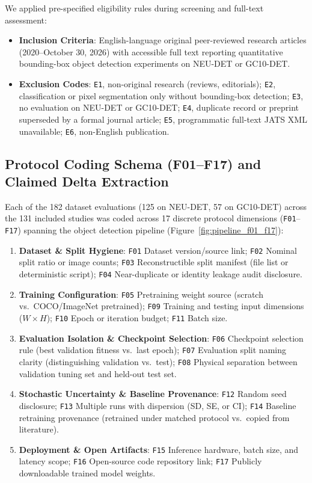 \documentclass[pdflatex,sn-apa]{sn-jnl}
\begin{document}
We applied pre-specified eligibility rules during screening and full-text assessment:
\begin{itemize}[leftmargin=2em, itemsep=0.1em]
    \item \textbf{Inclusion Criteria}: English-language original peer-reviewed research articles (2020--October 30, 2026) with accessible full text reporting quantitative bounding-box object detection experiments on NEU-DET or GC10-DET.
    \item \textbf{Exclusion Codes}: \texttt{E1}, non-original research (reviews, editorials); \texttt{E2}, classification or pixel segmentation only without bounding-box detection; \texttt{E3}, no evaluation on NEU-DET or GC10-DET; \texttt{E4}, duplicate record or preprint superseded by a formal journal article; \texttt{E5}, programmatic full-text JATS XML unavailable; \texttt{E6}, non-English publication.
\end{itemize}

\subsection{Protocol Coding Schema (F01--F17) and Claimed Delta Extraction}
Each of the 182 dataset evaluations (125 on NEU-DET, 57 on GC10-DET) across the 131 included studies was coded across 17 discrete protocol dimensions (\texttt{F01}--\texttt{F17}) spanning the object detection pipeline (Figure~\ref{fig:pipeline_f01_f17}):
\begin{enumerate}[leftmargin=2em, itemsep=0.05em]
    \item \textbf{Dataset \& Split Hygiene}: \texttt{F01} Dataset version/source link; \texttt{F02} Nominal split ratio or image counts; \texttt{F03} Reconstructible split manifest (file list or deterministic script); \texttt{F04} Near-duplicate or identity leakage audit disclosure.
    \item \textbf{Training Configuration}: \texttt{F05} Pretraining weight source (scratch vs.\ COCO/ImageNet pretrained); \texttt{F09} Training and testing input dimensions ($W \times H$); \texttt{F10} Epoch or iteration budget; \texttt{F11} Batch size.
    \item \textbf{Evaluation Isolation \& Checkpoint Selection}: \texttt{F06} Checkpoint selection rule (best validation fitness vs.\ last epoch); \texttt{F07} Evaluation split naming clarity (distinguishing validation vs.\ test); \texttt{F08} Physical separation between validation tuning set and held-out test set.
    \item \textbf{Stochastic Uncertainty \& Baseline Provenance}: \texttt{F12} Random seed disclosure; \texttt{F13} Multiple runs with dispersion (SD, SE, or CI); \texttt{F14} Baseline retraining provenance (retrained under matched protocol vs.\ copied from literature).
    \item \textbf{Deployment \& Open Artifacts}: \texttt{F15} Inference hardware, batch size, and latency scope; \texttt{F16} Open-source code repository link; \texttt{F17} Publicly downloadable trained model weights.
\end{enumerate}
\end{document}
